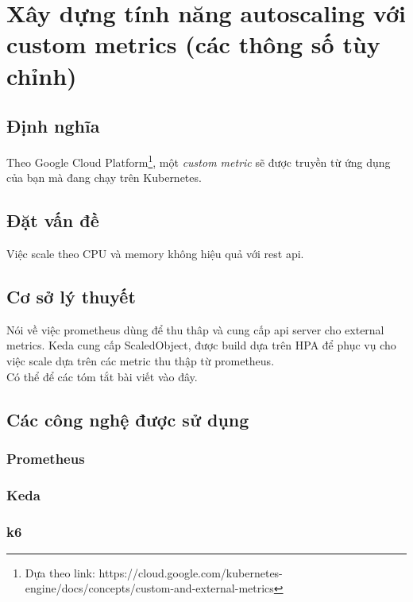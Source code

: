 \section{Xây dựng tính năng autoscaling với custom metrics (các thông số tùy chỉnh)}

\subsection{Định nghĩa}
\noindent Theo Google Cloud Platform\footnote{Dựa theo link: https://cloud.google.com/kubernetes-engine/docs/concepts/custom-and-external-metrics}, một \textit{custom metric} sẽ được truyền từ ứng dụng của bạn mà đang chạy trên Kubernetes.
\subsection{Đặt vấn đề}
\noindent Việc scale theo CPU và memory không hiệu quả với rest api.
\subsection{Cơ sở lý thuyết}
\noindent Nói về việc prometheus dùng để thu thâp và cung cấp api server cho external metrics. Keda cung cấp ScaledObject, được build dựa trên HPA để phục vụ cho việc scale dựa trên các metric thu thập từ prometheus.\\
\noindent Có thể để các tóm tắt bài viết vào đây.
\subsection{Các công nghệ được sử dụng}
\subsubsection{Prometheus}
\subsubsection{Keda}
\subsubsection{k6}

